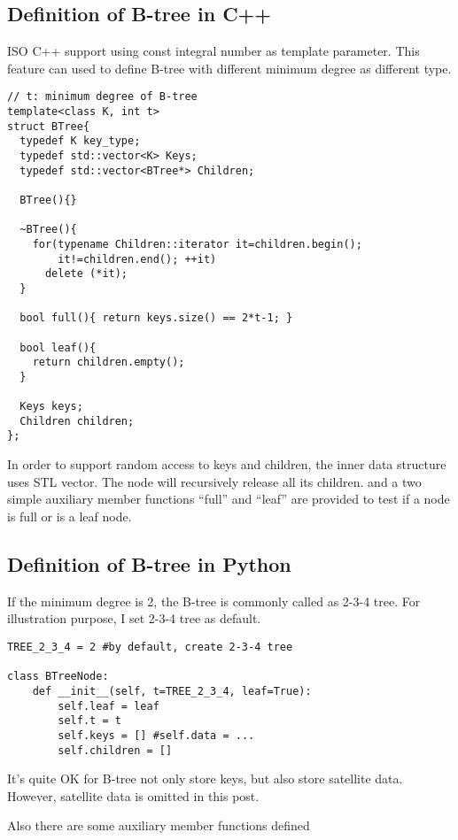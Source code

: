 \documentclass{article}
\begin{document}
\subsection*{Definition of B-tree in C++}
ISO C++ support using const integral number as template parameter.
This feature can used to define B-tree with different minimum degree
as different type.

\lstset{language=C++}
\begin{lstlisting}
// t: minimum degree of B-tree
template<class K, int t>
struct BTree{
  typedef K key_type;
  typedef std::vector<K> Keys;
  typedef std::vector<BTree*> Children;

  BTree(){}

  ~BTree(){
    for(typename Children::iterator it=children.begin();
        it!=children.end(); ++it)
      delete (*it);
  }

  bool full(){ return keys.size() == 2*t-1; }

  bool leaf(){
    return children.empty();
  }

  Keys keys;
  Children children;
};
\end{lstlisting}

In order to support random access to keys and children, the
inner data structure uses STL vector. The node will recursively
release all its children. and a two simple auxiliary member
functions ``full'' and ``leaf'' are provided to test if a node
is full or is a leaf node.

\subsection*{Definition of B-tree in Python}

If the minimum degree is 2, the B-tree is commonly called as 2-3-4 tree.
For illustration purpose, I set 2-3-4 tree as default.

\lstset{language=Python}
\begin{lstlisting}
TREE_2_3_4 = 2 #by default, create 2-3-4 tree

class BTreeNode:
    def __init__(self, t=TREE_2_3_4, leaf=True):
        self.leaf = leaf
        self.t = t
        self.keys = [] #self.data = ...
        self.children = []
\end{lstlisting}

It's quite OK for B-tree not only store keys, but also store satellite data.
However, satellite data is omitted in this post.

Also there are some auxiliary member functions defined
\end{document}
